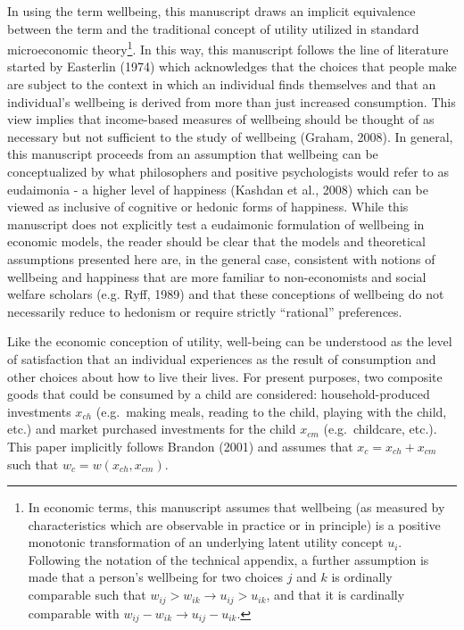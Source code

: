 \documentclass[review]{elsarticle}\usepackage[]{graphicx}\usepackage[]{color}
\begin{document}
In using the term wellbeing, this manuscript draws an implicit
equivalence between the term and the traditional concept of utility
utilized in standard microeconomic theory\footnote{In economic terms,
  this manuscript assumes that wellbeing (as measured by characteristics
  which are observable in practice or in principle) is a positive
  monotonic transformation of an underlying latent utility concept
  $u_i$. Following the notation of the technical appendix, a further
  assumption is made that a person's wellbeing for two choices $j$ and
  $k$ is ordinally comparable such that
  $w_{ij} > w_{ik} \rightarrow u_{ij} > u_{ik}$, and that it is
  cardinally comparable with
  $w_{ij} - w_{ik} \rightarrow u_{ij} - u_{ik}$.}. In this way, this
manuscript follows the line of literature started by Easterlin (1974)
which acknowledges that the choices that people make are subject to the
context in which an individual finds themselves and that an individual's
wellbeing is derived from more than just increased consumption. This
view implies that income-based measures of wellbeing should be thought
of as necessary but not sufficient to the study of wellbeing (Graham,
2008). In general, this manuscript proceeds from an assumption that
wellbeing can be conceptualized by what philosophers and positive
psychologists would refer to as eudaimonia - a higher level of happiness
(Kashdan et al., 2008) which can be viewed as inclusive of cognitive or
hedonic forms of happiness. While this manuscript does not explicitly
test a eudaimonic formulation of wellbeing in economic models, the
reader should be clear that the models and theoretical assumptions
presented here are, in the general case, consistent with notions of
wellbeing and happiness that are more familiar to non-economists and
social welfare scholars (e.g. Ryff, 1989) and that these conceptions of
wellbeing do not necessarily reduce to hedonism or require strictly
``rational'' preferences.

Like the economic conception of utility, well-being can be understood as
the level of satisfaction that an individual experiences as the result
of consumption and other choices about how to live their lives. For
present purposes, two composite goods that could be consumed by a child
are considered: household-produced investments $x_{ch}$ (e.g.~making
meals, reading to the child, playing with the child, etc.) and market
purchased investments for the child $x_{cm}$ (e.g.~childcare, etc.).
This paper implicitly follows Brandon (2001) and assumes that
$x_c = x_{ch} + x_{cm}$ such that $w_c=w(x_{ch},x_{cm})$.
\end{document}
